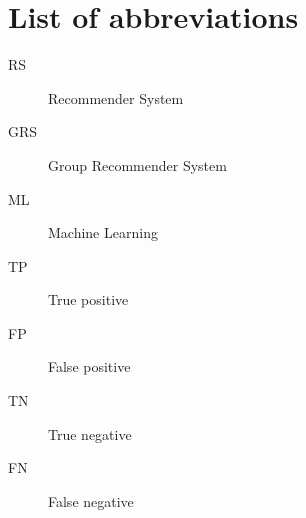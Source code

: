 \chapter*{List of abbreviations}

\raggedright
\begin{description}
    \item [RS] Recommender System
    \item [GRS] Group Recommender System
    \item [ML] Machine Learning
    \item [TP] True positive 
    \item [FP] False positive
    \item [TN] True negative
    \item [FN] False negative
\end{description}
